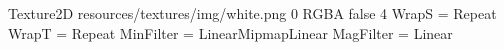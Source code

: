 Texture2D
resources/textures/img/white.png
0
RGBA
false
4
WrapS = Repeat
WrapT = Repeat
MinFilter = LinearMipmapLinear
MagFilter = Linear

